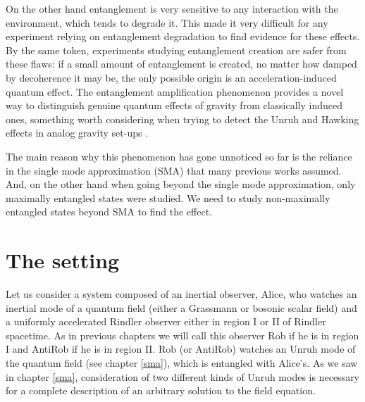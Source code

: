 On the other hand entanglement is very sensitive to any interaction with the environment, which tends to degrade it. This made it very difficult for any experiment relying on entanglement degradation \cite{Alicefalls} to find evidence for these effects. By the same token, experiments studying entanglement creation are safer from these flaws: if a small amount of entanglement is created, no matter how damped by decoherence it may be, the only possible origin is an acceleration-induced quantum effect. The entanglement amplification phenomenon provides a novel way to distinguish genuine quantum effects of gravity from classically induced ones, something worth considering when trying to detect the Unruh and Hawking effects in analog gravity set-ups \cite{garay}.  

The main reason why this phenomenon has gone unnoticed so far is the reliance in the single mode approximation (SMA)  that many previous works assumed. And, on the other hand when going beyond the single mode approximation, only maximally entangled states were studied. We need to study non-maximally entangled states beyond SMA to find the effect.


\section{The setting}

Let us consider a system composed of an inertial observer, Alice, who watches an inertial mode of a quantum field (either a Grassmann or bosonic scalar  field) and a uniformly accelerated Rindler observer either in region I or II of Rindler spacetime. As in previous chapters we will call this observer Rob if he is in region I and AntiRob if he is in region II. Rob (or AntiRob) watches an Unruh mode of the quantum field (see chapter \ref{sma}), which is entangled with Alice's. As we saw in chapter \ref{sma}, consideration of two different kinds of Unruh modes is necessary for a complete description of an arbitrary solution to the field equation.

